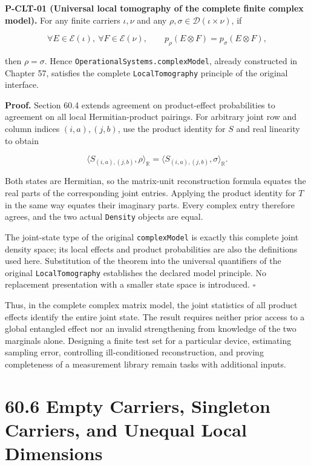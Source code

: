 \documentclass[
  11pt,
  oneside]{book}
\begin{document}
\label{p-clt-01}{}

\textbf{P-CLT-01 (Universal local tomography of the complete finite
complex model).} For any finite carriers \(\iota,\nu\) and any
\(\rho,\sigma\in\mathcal D(\iota\times\nu)\), if

\[
\forall E\in\mathcal E(\iota),\ 
\forall F\in\mathcal E(\nu),\qquad
p_\rho(E\otimes F)=p_\sigma(E\otimes F),
\]

then \(\rho=\sigma\). Hence \texttt{Operational\allowbreak Systems.\allowbreak complex\allowbreak Model},
already constructed in Chapter 57, satisfies the complete
\texttt{Local\allowbreak Tomography} principle of the original interface.

\textbf{Proof.} Section 60.4 extends agreement on product-effect
probabilities to agreement on all local Hermitian-product pairings. For
arbitrary joint row and column indices \((i,a),(j,b)\), use the product
identity for \(S\) and real linearity to obtain

\[
\langle S_{(i,a),(j,b)},\rho\rangle_{\mathbb R}
=\langle S_{(i,a),(j,b)},\sigma\rangle_{\mathbb R}.
\]

Both states are Hermitian, so the matrix-unit reconstruction formula
equates the real parts of the corresponding joint entries. Applying the
product identity for \(T\) in the same way equates their imaginary
parts. Every complex entry therefore agrees, and the two actual
\texttt{Density} objects are equal.

The joint-state type of the original \texttt{complex\allowbreak Model} is exactly
this complete joint density space; its local effects and product
probabilities are also the definitions used here. Substitution of the
theorem into the universal quantifiers of the original
\texttt{Local\allowbreak Tomography} establishes the declared model principle. No
replacement presentation with a smaller state space is introduced.
\(\square\)

Thus, in the complete complex matrix model, the joint statistics of all
product effects identify the entire joint state. The result requires
neither prior access to a global entangled effect nor an invalid
strengthening from knowledge of the two marginals alone. Designing a
finite test set for a particular device, estimating sampling error,
controlling ill-conditioned reconstruction, and proving completeness of
a measurement library remain tasks with additional inputs.

\section{60.6 Empty Carriers, Singleton Carriers, and Unequal Local
Dimensions}
\end{document}
